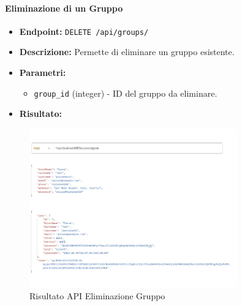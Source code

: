 \paragraph{Eliminazione di un Gruppo}
\begin{itemize}
    \item \textbf{Endpoint:} \texttt{DELETE /api/groups/}
    \item \textbf{Descrizione:} Permette di eliminare un gruppo esistente.
    \item \textbf{Parametri:}
    \begin{itemize}
        \item \texttt{group\_id} (integer) - ID del gruppo da eliminare.
    \end{itemize}
    \item \textbf{Risultato:}
\end{itemize}
\begin{figure}[h!]
    \centering
    \includegraphics[width=0.8\textwidth]{images/registerapi.png}
    \caption{Risultato API Eliminazione Gruppo}
    \label{fig:api_delete_group}
\end{figure}

